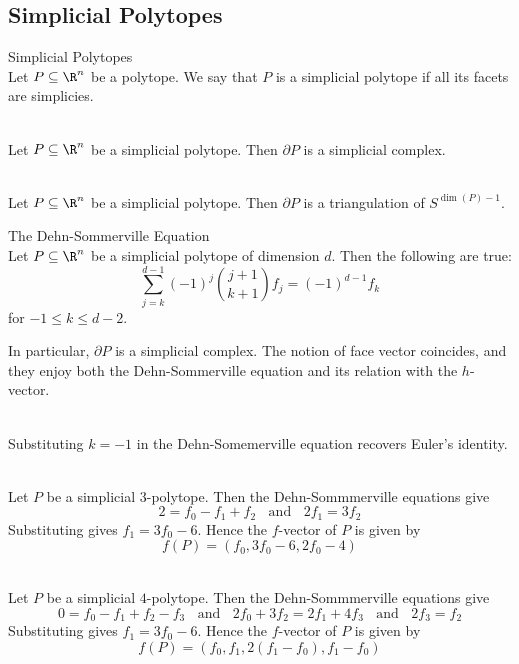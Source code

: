 \documentclass[a4paper]{article}
\begin{document}
\subsection{Simplicial Polytopes}
\begin{defn}{Simplicial Polytopes}{}\\
Let $P\subseteq\R^n$ be a polytope. We say that $P$ is a simplicial polytope if all its facets are simplicies. 
\end{defn}

\begin{lmm}{}{}\\
Let $P\subseteq\R^n$ be a simplicial polytope. Then $\partial P$ is a simplicial complex. 
\end{lmm}

\begin{lmm}{}{}\\
Let $P\subseteq\R^n$ be a simplicial polytope. Then $\partial P$ is a triangulation of $S^{\dim(P)-1}$. 
\end{lmm}

\begin{prp}{The Dehn-Sommerville Equation}{}\\
Let $P\subseteq\R^n$ be a simplicial polytope of dimension $d$. Then the following are true: $$\sum_{j=k}^{d-1}(-1)^j\binom{j+1}{k+1}f_j=(-1)^{d-1}f_k$$ for $-1\leq k\leq d-2$. 
\end{prp}

In particular, $\partial P$ is a simplicial complex. The notion of face vector coincides, and they enjoy both the Dehn-Sommerville equation and its relation with the $h$-vector. 

\begin{eg}{}{}\\
Substituting $k=-1$ in the Dehn-Somemerville equation recovers Euler's identity. 
\end{eg}

\begin{eg}{}{}\\
Let $P$ be a simplicial $3$-polytope. Then the Dehn-Sommmerville equations give $$2=f_0-f_1+f_2\;\;\text{ and }\;\;2f_1=3f_2$$ Substituting gives $f_1=3f_0-6$. Hence the $f$-vector of $P$ is given by $$f(P)=(f_0,3f_0-6,2f_0-4)$$
\end{eg}

\begin{eg}{}{}\\
Let $P$ be a simplicial $4$-polytope. Then the Dehn-Sommmerville equations give $$0=f_0-f_1+f_2-f_3\;\;\text{ and }\;\;2f_0+3f_2=2f_1+4f_3\;\;\text{ and }\;\;2f_3=f_2$$ Substituting gives $f_1=3f_0-6$. Hence the $f$-vector of $P$ is given by $$f(P)=(f_0,f_1,2(f_1-f_0),f_1-f_0)$$
\end{eg}
\end{document}
